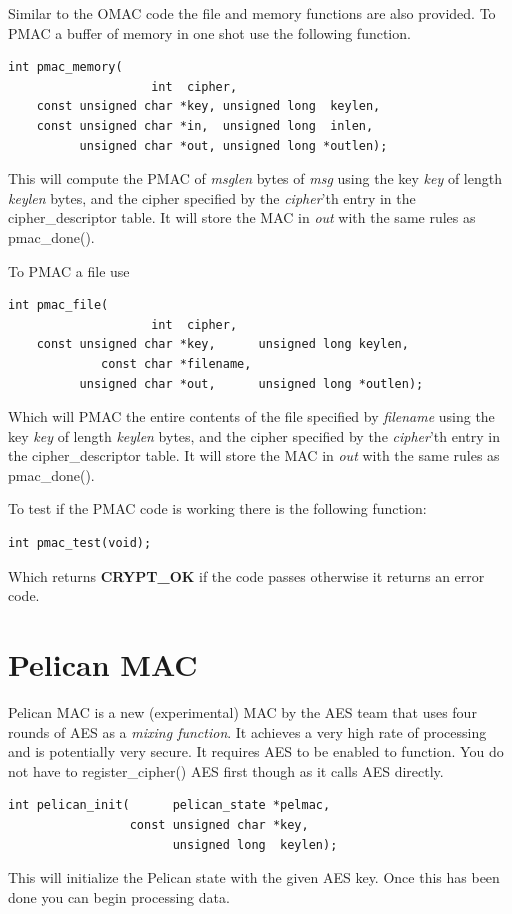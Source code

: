 \documentclass[synpaper]{book}
\newcommand{\mysection}[1]    %
	{                   %
	\section{#1}
   \markboth{\textsf{www.libtom.net}}{\thesection ~ {#1}}
	}
\begin{document}
Similar to the OMAC code the file and memory functions are also provided.  To PMAC a buffer of memory in one shot use the
following function.

\begin{verbatim}
int pmac_memory(
                    int  cipher,
    const unsigned char *key, unsigned long  keylen,
    const unsigned char *in,  unsigned long  inlen,
          unsigned char *out, unsigned long *outlen);
\end{verbatim}
This will compute the PMAC of \textit{msglen} bytes of \textit{msg} using the key \textit{key} of length \textit{keylen} bytes, and the cipher
specified by the \textit{cipher}'th entry in the cipher\_descriptor table.  It will store the MAC in \textit{out} with the same
rules as pmac\_done().

To PMAC a file use
\begin{verbatim}
int pmac_file(
                    int  cipher,
    const unsigned char *key,      unsigned long keylen,
             const char *filename,
          unsigned char *out,      unsigned long *outlen);
\end{verbatim}

Which will PMAC the entire contents of the file specified by \textit{filename} using the key \textit{key} of length \textit{keylen} bytes,
and the cipher specified by the \textit{cipher}'th entry in the cipher\_descriptor table.  It will store the MAC in \textit{out} with
the same rules as pmac\_done().

To test if the PMAC code is working there is the following function:
\begin{verbatim}
int pmac_test(void);
\end{verbatim}
Which returns {\bf CRYPT\_OK} if the code passes otherwise it returns an error code.

\mysection{Pelican MAC}
Pelican MAC is a new (experimental) MAC by the AES team that uses four rounds of AES as a \textit{mixing function}.  It achieves a very high
rate of processing and is potentially very secure.  It requires AES to be enabled to function.  You do not have to register\_cipher() AES first though
as it calls AES directly.

\begin{verbatim}
int pelican_init(      pelican_state *pelmac,
                 const unsigned char *key,
                       unsigned long  keylen);
\end{verbatim}
This will initialize the Pelican state with the given AES key.  Once this has been done you can begin processing data.
\end{document}
